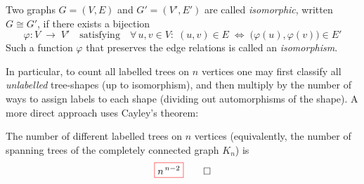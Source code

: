 \begin{definition}[Isomorphism]\label{def:isomorphism}
Two graphs \(G=(V,E)\) and \(G'=(V',E')\) are called \emph{isomorphic}, written \(G\cong G'\), if there exists a bijection
\[
  \varphi:V\;\longrightarrow\;V'
  \quad\text{satisfying}\quad
  \forall\,u,v\in V:\;(u,v)\in E\;\Longleftrightarrow\;\bigl(\varphi(u),\varphi(v)\bigr)\in E'
\]
Such a function \(\varphi\) that preserves the edge relations is called an \emph{isomorphism}.
\end{definition}

In particular, to count all labelled trees on \(n\) vertices one may first classify all \emph{unlabelled} tree-shapes (up to isomorphism), and then multiply by the number of ways to assign labels to each shape (dividing out automorphisms of the shape).
A more direct approach uses Cayley's theorem:

\begin{theorem}[Cayley]\label{thm:cayley}
The number of different labelled trees on \(n\) vertices (equivalently, the number of spanning trees of the completely connected graph \(K_n\)) is
\[
\fcolorbox{red}{white}{$\displaystyle
n^{\,n-2}
$} \qedhere
\]
\end{theorem}

